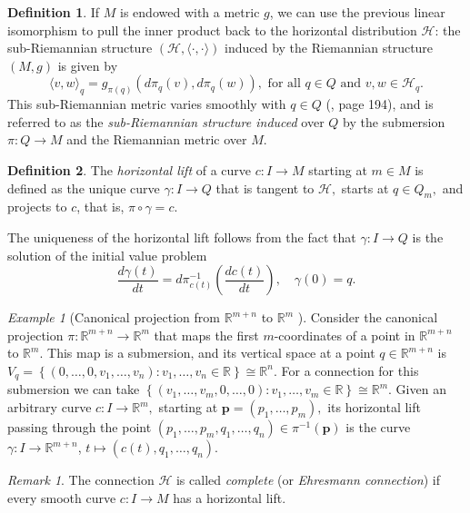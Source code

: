 \documentclass[12pt, letterpaper, reqno]{amsart}
\theoremstyle{definition}
\newtheorem{df}{Definition}
\theoremstyle{plain}
\theoremstyle{remark}
\newtheorem{ex}{Example}
\newtheorem{rem}{Remark}
\begin{document}
\begin{df}\label{df:ind_sub_struc}
If $ M $ is endowed with a metric $ g $, we can use the previous linear isomorphism to pull the inner product back to the horizontal distribution $ \mathcal{H}$: the sub-Riemannian structure $ (\mathcal{H},\langle \cdot, \cdot\rangle) $ induced by the Riemannian structure $ (M,g) $ is given by
$$ \langle v,w \rangle_q = g_{\pi(q)} \left( d\pi_q(v), d\pi_q(w) \right), \text{ for all }q\in Q \text{ and } v,w\in \mathcal{H}_q.   $$ 
This sub-Riemannian metric varies smoothly with $ q\in Q $ (\cite{montgomery2002tour}, page 194), and is referred to as the \textit{sub-Riemannian structure induced} over $ Q $ by the submersion $ \pi: Q \rightarrow M $ and the Riemannian metric over $ M. $ 
\end{df}
\begin{df}
	The \textit{horizontal lift} of a curve $ c: I \rightarrow {M} $ starting at $ m\in M $ is defined as the unique curve $ \gamma : I \rightarrow {Q} $ that is tangent to $ \mathcal{H}, $ starts at $ q\in Q_m, $ and projects to $c$, that is, $ \pi\circ\gamma = c. $ 
\end{df}

The uniqueness of the horizontal lift follows from the fact that $ \gamma: I \rightarrow Q $ is the solution of the initial value problem
$$ \frac{d\gamma(t)}{dt} = d\pi^{-1}_{c(t)} \left( \frac{dc(t)}{dt}  \right),\quad \gamma(0)=q.  $$ 
\begin{ex}[Canonical projection from $ \mathbb{R}^{m+n} $ to $ \mathbb{R}^m $  ]\label{ex:can_proj}
	\sloppy	Consider the canonical projection $ \pi: \mathbb{R}^{m+n} \rightarrow \mathbb{R}^m $ that maps the first $ m $-coordinates of a point in $ \mathbb{R}^{m+n} $  to $ \mathbb{R}^m. $ This map is a submersion, and its vertical space at a point $ q\in \mathbb{R}^{m+n} $ is $ V_q = \left\{ (0,\dots,0,v_1,\dots,v_n) : v_1,\dots,v_n\in \mathbb{R}  \right\} \cong \mathbb{R}^n. $ For a connection for this submersion we can take $ \left\{ (v_1,\dots,v_m, 0,\dots, 0): v_1,\dots,v_m\in \mathbb{R} \right\}\cong \mathbb{R}^m.  $ Given an arbitrary curve $ c: I \rightarrow \mathbb{R}^m, $ starting at $ \boldsymbol{p}= (p_1,\dots,p_m), $ its horizontal lift passing through the point $ (p_1,\dots,p_m,q_1,\dots,q_n)\in \pi^{-1}( \boldsymbol{p} ) $ is the curve $ \gamma: I \rightarrow \mathbb{R}^{m+n} $, $ t\mapsto (c(t),q_1,\dots,q_n). $   
\end{ex}
\begin{rem}
	The connection $ \mathcal{H} $ is called \textit{complete} (or \textit{Ehresmann connection})  if every smooth curve $ c: I \rightarrow {M} $ has a horizontal lift.
\end{rem}
\end{document}

